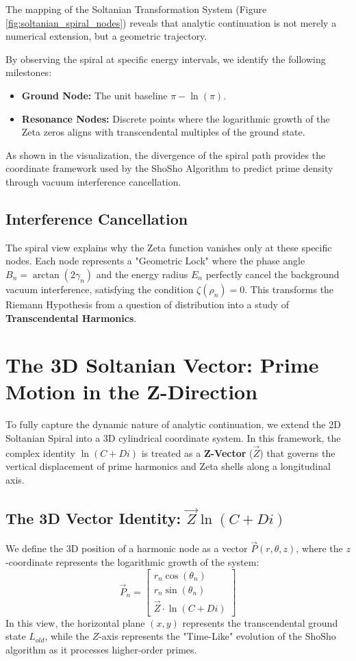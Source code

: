 \documentclass[11pt,a4paper]{article}
\begin{document}
The mapping of the Soltanian Transformation System (Figure \ref{fig:soltanian_spiral_nodes}) reveals that analytic continuation is not merely a numerical extension, but a geometric trajectory. 

By observing the spiral at specific energy intervals, we identify the following milestones:
\begin{itemize}
    \item \textbf{Ground Node:} The unit baseline $\pi - \ln(\pi)$.
    \item \textbf{Resonance Nodes:} Discrete points where the logarithmic growth of the Zeta zeros aligns with transcendental multiples of the ground state.
\end{itemize}

As shown in the visualization, the divergence of the spiral path provides the coordinate framework used by the ShoSho Algorithm to predict prime density through vacuum interference cancellation.

\subsection{Interference Cancellation}
The spiral view explains why the Zeta function vanishes only at these specific nodes. Each node represents a "Geometric Lock" where the phase angle $B_n = \arctan(2\gamma_n)$ and the energy radius $E_n$ perfectly cancel the background vacuum interference, satisfying the condition $\zeta(\rho_n) = 0$. This transforms the Riemann Hypothesis from a question of distribution into a study of \textbf{Transcendental Harmonics}.

\section{The 3D Soltanian Vector: Prime Motion in the Z-Direction}

To fully capture the dynamic nature of analytic continuation, we extend the 2D Soltanian Spiral into a 3D cylindrical coordinate system. In this framework, the complex identity $\ln(C + Di)$ is treated as a \textbf{Z-Vector} ($\vec{Z}$) that governs the vertical displacement of prime harmonics and Zeta shells along a longitudinal axis.

\subsection{The 3D Vector Identity: $\vec{Z} \ln(C + Di)$}
We define the 3D position of a harmonic node as a vector $\vec{P}(r, \theta, z)$, where the $z$-coordinate represents the logarithmic growth of the system:
\begin{equation}
    \vec{P}_n = \begin{bmatrix} r_n \cos(\theta_n) \\ r_n \sin(\theta_n) \\ \vec{Z} \cdot \ln(C + Di) \end{bmatrix}
\end{equation}
In this view, the horizontal plane $(x, y)$ represents the transcendental ground state $L_{old}$, while the $Z$-axis represents the "Time-Like" evolution of the ShoSho algorithm as it processes higher-order primes.
\end{document}
